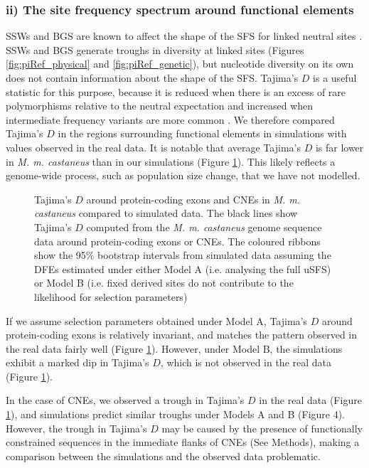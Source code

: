 \subsubsection{ii) The site frequency spectrum around functional elements}

	SSWs and BGS are known to affect the shape of the SFS for linked neutral sites \citep{RN287, RN234, RN343}. SSWs and BGS generate troughs in diversity at linked sites (Figures \ref{fig:piRef_physical} and \ref{fig:piRef_genetic}), but nucleotide diversity on its own does not contain information about the shape of the SFS. Tajima’s $D$ is a useful statistic for this purpose, because it is reduced when there is an excess of rare polymorphisms relative to the neutral expectation and increased when intermediate frequency variants are more common \citep{RN90}. We therefore compared Tajima’s $D$ in the regions surrounding functional elements in simulations with values observed in the real data. It is notable that average Tajima’s $D$ is far lower in \textit{M. m. castaneus} than in our simulations (Figure \ref{fig:TajimaPlot}). This likely reflects a genome-wide process, such as population size change, that we have not modelled.

 \begin{figure}[H]
   \centering      
   \noindent{}
 \caption[Tajima's $D$ around functional elements in \textit{M. m. castaneus} and simulated populations]{Tajima’s $D$ around protein-coding exons and CNEs in \textit{M. m. castaneus} compared to simulated data. The black lines show Tajima’s $D$ computed from the \textit{M. m. castaneus} genome sequence data around protein-coding exons or CNEs. The coloured ribbons show the 95\% bootstrap intervals from simulated data assuming the DFEs estimated under either Model A (i.e. analysing the full uSFS) or Model B (i.e. fixed derived sites do not contribute to the likelihood for selection parameters)}
 \label{fig:TajimaPlot}
\end{figure}


	If we assume selection parameters obtained under Model A, Tajima’s $D$ around protein-coding exons is relatively invariant, and matches the pattern observed in the real data fairly well (Figure \ref{fig:TajimaPlot}). However, under Model B, the simulations exhibit a marked dip in Tajima’s $D$, which is not observed in the real data (Figure \ref{fig:TajimaPlot}).

	In the case of CNEs, we observed a trough in Tajima’s $D$ in the real data (Figure \ref{fig:TajimaPlot}), and simulations predict similar troughs under Models A and B (Figure 4). However, the trough in Tajima’s $D$ may be caused by the presence of functionally constrained sequences in the immediate flanks of CNEs (See Methods), making a comparison between the simulations and the observed data problematic.

